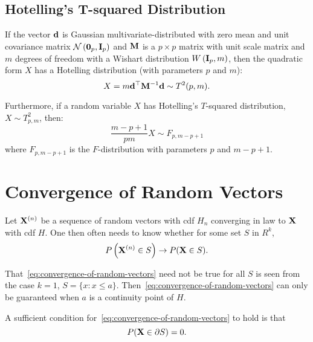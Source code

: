 \subsection{Hotelling's T-squared Distribution}

\begin{definition}
	If the vector \(\mathbf{d}\) is Gaussian multivariate-distributed with zero mean and unit covariance matrix \(\mathcal{N}\left(\mathbf{0}_p,\mathbf{I}_{p}\right)\) and \(\mathbf{M}\) is a \(p\times p\) matrix with unit scale matrix and \(m\) degrees of freedom with a Wishart distribution \(W\left(\mathbf{I}_{p},m\right)\), then the quadratic form \(X\) has a Hotelling distribution (with parameters \(p\) and \(m\)):
	\begin{equation*}
		X=m\mathbf{d}^{\top}\mathbf{M}^{-1}\mathbf{d}\sim T^2(p,m).
	\end{equation*}

	Furthermore, if a random variable \(X\) has Hotelling's \(T\)-squared distribution, \(X \sim T_{p,m}^2\), then:
	\begin{equation*}
		\frac{m-p+1}{pm}X\sim F_{p,m-p+1}
	\end{equation*}
	where \(F_{p,m-p+1}\) is the \(F\)-distribution with parameters \(p\) and \(m-p+1\).
\end{definition}

\section{Convergence of Random Vectors}

Let \(\mathbf{X}^{(n)}\) be a sequence of random vectors with cdf \(H_n\) converging in law to \(\mathbf{X}\) with cdf \(H\). One then often needs to know whether for some set \(S\) in \(R^k\),
\begin{equation}
	\label{eq:convergence-of-random-vectors}
	P\left(\mathbf{X}^{(n)} \in S\right) \rightarrow P(\mathbf{X} \in S).
\end{equation}

That~\eqref{eq:convergence-of-random-vectors} need not be true for all \(S\) is seen from the case \(k=1\), \(S=\{x:x\leq a\}\). Then~\eqref{eq:convergence-of-random-vectors} can only be guaranteed when \(a\) is a continuity point of \(H\).
\begin{theorem}\label{thm:sufficient-condition-for-convergence-of-random-vectors}
	A sufficient condition for~\eqref{eq:convergence-of-random-vectors} to hold is that
	\begin{equation*}
		P(\mathbf{X}\in\partial S)=0.
	\end{equation*}
\end{theorem}

